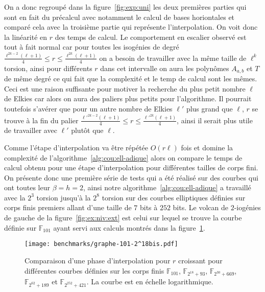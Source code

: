 \documentclass[10pt,a4paper]{book}
\theoremstyle{plain}
\theoremstyle{definition}
\theoremstyle{definition}
\theoremstyle{definition}
\theoremstyle{definition}
\theoremstyle{remark}
\theoremstyle{remark}
\theoremstyle{definition}
\begin{document}
On a donc regroupé dans la figure~\ref{fig:exp:uni} les deux premières parties
qui sont en fait du précalcul avec notamment le calcul de bases horiontales et 
comparé cela avec la troisième partie qui représente l'interpolation. On voit 
donc la linéarité en $r$ des temps de calcul. 
Le comportement en escalier observé est tout à fait normal car pour toutes les 
isogénies de degré 
$\frac{\ell^{2k-2}(\ell+1)}{4} \leqslant r \leqslant \frac{\ell^{2k}(\ell+1)}{4}$ 
on a besoin de travailler avec la même taille de $\ell^{k}$ torsion, ainsi pour 
différents $r$ dans cet intervalle on aura les polynômes $A_{a,b}$ et $T$ de 
même degré ce qui fait que la complexité et le temp de calcul sont les mêmes. 
Ceci est une raison 
suffisante pour motiver la recherche du plus petit nombre $\ell$ de Elkies car
alors on aura des paliers plus petits pour l'algorithme. Il pourrait toutefois 
s'avérer que pour un autre nombre de Elkies $\ell'$ plus grand que $\ell$, $r$ 
se trouve à la fin du palier $\frac{\ell'^{2k-2}(\ell+1)}{4} \leqslant r 
\leqslant \frac{\ell'^{2k}(\ell+1)}{4}$, ainsi il serait plus utile de 
travailler avec $\ell'$ plutôt que $\ell$.

Comme l'étape d'interpolation va être répétée $O(r \ell)$ fois et domine la 
complexité de l'algorithme~\ref{alg:cou:ell-adique} alors on compare le temps 
de calcul obtenu pour une étape d'interpolation pour différentes tailles de 
corps fini.
On présente donc une première série de tests qui a été réalisé sur des 
courbes qui ont toutes leur $\beta=h=2$, ainsi notre 
algorithme~\ref{alg:cou:ell-adique} a travaillé avec la $2^3$ torsion jusqu'à la 
$2^8$ torsion sur des courbes elliptiques définies sur corps finis premiers 
allant d'une taille de $7$ bits à $252$ bits. Le volcan de $2$-iogénies de 
gauche de la figure~\ref{fig:ex:niv:ext} est celui sur lequel se trouve la 
courbe définie sur $\mathbb{F}_{101}$ ayant servi aux calculs montrés dans la 
figure~\ref{fig:exp:dif}.

\begin{figure}
\begin{center}
%
\texttt{[image: benchmarks/graphe-101-2^18bis.pdf]} 
%
\caption{\label{fig:exp:dif} Comparaison d'une phase d'interpolation pour $r$ croissant pour différentes courbes définies sur les corps finis $\mathbb{F}_{101}$, $\mathbb{F}_{2^{18}+93 }$, $\mathbb{F}_{2^{30}+669}$, $\mathbb{F}_{2^{62}+189}$ et $\mathbb{F}_{2^{252}+421}$. La courbe est en échelle logarithmique.}
\end{center}
\end{figure}
\end{document}
